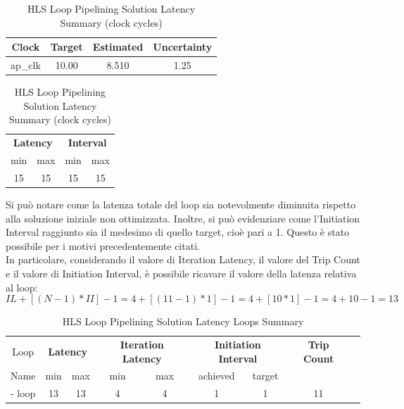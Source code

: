 \begin{table}[H]
    \centering
    \begin{minipage}[t]{0.45\linewidth}
        \centering
        \begin{tabular}{|c|c|c|c|}
            \hline
            \textbf{Clock} & \textbf{Target} & \textbf{Estimated} & \textbf{Uncertainty} \\
            \hline
            ap\_clk & 10.00 & 8.510 & 1.25 \\
            \hline
        \end{tabular}
        \caption{HLS Loop Pipelining Solution Timing Summary (ns)}
        \label{tab:hls-loop-pipelining-solution-timing-summary}
    \end{minipage}
    \hfill
    \begin{minipage}[t]{0.45\linewidth}
        \centering
        \begin{tabular}{|c|c|c|c|}
            \hline
            \multicolumn{2}{|c|}{\textbf{Latency}} & \multicolumn{2}{|c|}{\textbf{Interval}} \\
            min & max & min & max \\
            \hline
            15 & 15 & 15 & 15 \\
            \hline
        \end{tabular}
        \caption{HLS Loop Pipelining Solution Latency Summary (clock cycles)}
        \label{tab:hls-loop-pipelining-solution-latency-summary}
    \end{minipage}
\end{table}

Si può notare come la latenza totale del loop sia notevolmente diminuita rispetto alla soluzione iniziale non ottimizzata. Inoltre, si può evidenziare come l'Initiation Interval raggiunto sia il medesimo di quello target, cioè pari a 1. Questo è stato possibile per i motivi precedentemente citati.
\\
In particolare, considerando il valore di Iteration Latency, il valore del Trip Count e il valore di Initiation Interval, è possibile ricavare il valore della latenza relativa al loop:
\begin{equation}
	IL+[(N-1)*II]-1 = 4+[(11-1)*1]-1 = 4+[10*1]-1 = 4+10-1 = 13	
\end{equation}

\begin{table}[H]
    \centering
    \begin{tabular}{|c|c|c|c|c|c|c|c|c|}
        \hline
        \multicolumn{1}{|c|}{Loop} & \multicolumn{2}{|c|}{\textbf{Latency}} & \multicolumn{2}{c|}{\textbf{Iteration Latency}} & \multicolumn{2}{c|}{\textbf{Initiation Interval}} & \multicolumn{1}{c|}{\textbf{Trip Count}}  \\
        Name & min & max & min & max & achieved & target &  \\
        \hline
        - loop & 13 & 13 & 4 & 4 & 1 & 1 & 11 \\
        \hline
    \end{tabular}
    \caption{HLS Loop Pipelining Solution Latency Loops Summary }
    \label{tab:hls-loop-pipelining-solution-loop-summary}
\end{table}


